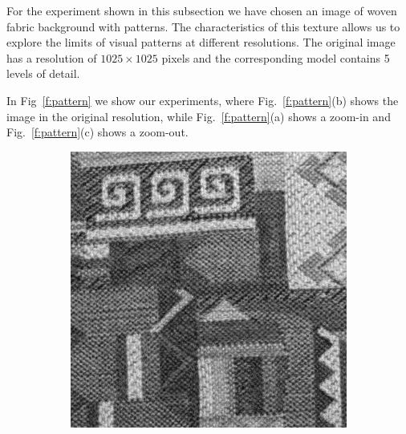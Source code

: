 For the experiment shown in this subsection we have chosen an image of woven fabric background with patterns. The characteristics of this texture allows us to explore the limits of visual patterns at different resolutions. The original image has a resolution of $1025\times 1025$ pixels and the corresponding model contains 5 levels of detail.

In Fig~\ref{f:pattern} we show our experiments, where Fig.~\ref{f:pattern}(b) shows the image in the original resolution, while Fig.~\ref{f:pattern}(a) shows a zoom-in and Fig.~\ref{f:pattern}(c) shows a zoom-out.

\begin{figure}[!h]
\centering
\begin{subfigure}{0.39\linewidth}
  \centering
\includegraphics[width=\linewidth]{img/ch5/tex_zoom_in_stage_5.png}
\caption{}
\end{subfigure}
\begin{subfigure}{0.39\linewidth}
  \centering

\end{subfigure}
\end{figure}
